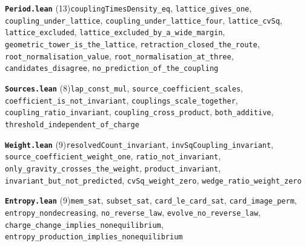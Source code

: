 \documentclass[11pt,a4paper]{article}
\theoremstyle{sudef}
\begin{document}
\noindent\textbf{\texttt{Period.lean}} (13)\quad \texttt{couplingTimesDensity\_\allowbreak eq}, \texttt{lattice\_\allowbreak gives\_\allowbreak one}, \texttt{coupling\_\allowbreak under\_\allowbreak lattice}, \texttt{coupling\_\allowbreak under\_\allowbreak lattice\_\allowbreak four}, \texttt{lattice\_\allowbreak cvSq}, \texttt{lattice\_\allowbreak excluded}, \texttt{lattice\_\allowbreak excluded\_\allowbreak by\_\allowbreak a\_\allowbreak wide\_\allowbreak margin}, \texttt{geometric\_\allowbreak tower\_\allowbreak is\_\allowbreak the\_\allowbreak lattice}, \texttt{retraction\_\allowbreak closed\_\allowbreak the\_\allowbreak route}, \texttt{root\_\allowbreak normalisation\_\allowbreak value}, \texttt{root\_\allowbreak normalisation\_\allowbreak at\_\allowbreak three}, \texttt{candidates\_\allowbreak disagree}, \texttt{no\_\allowbreak prediction\_\allowbreak of\_\allowbreak the\_\allowbreak coupling}\par\smallskip
\noindent\textbf{\texttt{Sources.lean}} (8)\quad \texttt{lap\_\allowbreak const\_\allowbreak mul}, \texttt{source\_\allowbreak coefficient\_\allowbreak scales}, \texttt{coefficient\_\allowbreak is\_\allowbreak not\_\allowbreak invariant}, \texttt{couplings\_\allowbreak scale\_\allowbreak together}, \texttt{coupling\_\allowbreak ratio\_\allowbreak invariant}, \texttt{coupling\_\allowbreak cross\_\allowbreak product}, \texttt{both\_\allowbreak additive}, \texttt{threshold\_\allowbreak independent\_\allowbreak of\_\allowbreak charge}\par\smallskip
\noindent\textbf{\texttt{Weight.lean}} (9)\quad \texttt{resolvedCount\_\allowbreak invariant}, \texttt{invSqCoupling\_\allowbreak invariant}, \texttt{source\_\allowbreak coefficient\_\allowbreak weight\_\allowbreak one}, \texttt{ratio\_\allowbreak not\_\allowbreak invariant}, \texttt{only\_\allowbreak gravity\_\allowbreak crosses\_\allowbreak the\_\allowbreak weight}, \texttt{product\_\allowbreak invariant}, \texttt{invariant\_\allowbreak but\_\allowbreak not\_\allowbreak predicted}, \texttt{cvSq\_\allowbreak weight\_\allowbreak zero}, \texttt{wedge\_\allowbreak ratio\_\allowbreak weight\_\allowbreak zero}\par\smallskip
\noindent\textbf{\texttt{Entropy.lean}} (9)\quad \texttt{mem\_\allowbreak sat}, \texttt{subset\_\allowbreak sat}, \texttt{card\_\allowbreak le\_\allowbreak card\_\allowbreak sat}, \texttt{card\_\allowbreak image\_\allowbreak perm}, \texttt{entropy\_\allowbreak nondecreasing}, \texttt{no\_\allowbreak reverse\_\allowbreak law}, \texttt{evolve\_\allowbreak no\_\allowbreak reverse\_\allowbreak law}, \texttt{charge\_\allowbreak change\_\allowbreak implies\_\allowbreak nonequilibrium}, \texttt{entropy\_\allowbreak production\_\allowbreak implies\_\allowbreak nonequilibrium}\par\smallskip
\end{document}
